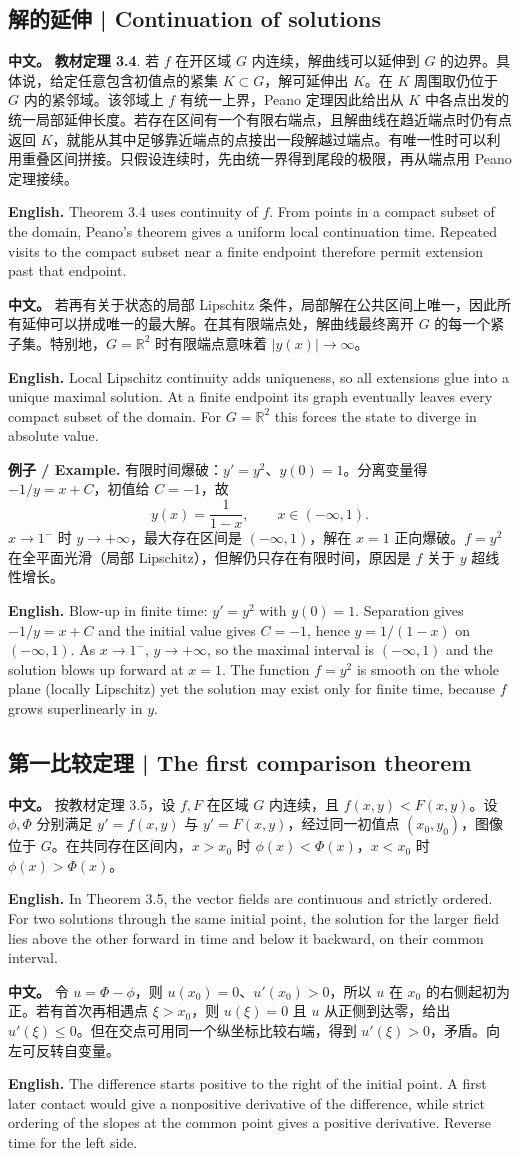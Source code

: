 \documentclass[UTF8,11pt,a4paper]{ctexart}
\newcommand{\APS}[2]{\par\noindent\textbf{中文。} #1\par\noindent\textbf{English.} #2\par}
\newcommand{\EN}[1]{\par\noindent \textbf{English.} #1\par}
\newcommand{\EX}[2]{\par\noindent \textbf{例子 / Example.} #1\par\EN{#2}}
\begin{document}
\subsection{解的延伸 | Continuation of solutions}
\APS{\textbf{教材定理 3.4}. 若 $f$ 在开区域 $G$ 内连续，解曲线可以延伸到 $G$ 的边界。具体说，给定任意包含初值点的紧集 $K\subset G$，解可延伸出 $K$。在 $K$ 周围取仍位于 $G$ 内的紧邻域。该邻域上 $f$ 有统一上界，Peano 定理因此给出从 $K$ 中各点出发的统一局部延伸长度。若存在区间有一个有限右端点，且解曲线在趋近端点时仍有点返回 $K$，就能从其中足够靠近端点的点接出一段解越过端点。有唯一性时可以利用重叠区间拼接。只假设连续时，先由统一界得到尾段的极限，再从端点用 Peano 定理接续。}{Theorem 3.4 uses continuity of $f$. From points in a compact subset of the domain, Peano's theorem gives a uniform local continuation time. Repeated visits to the compact subset near a finite endpoint therefore permit extension past that endpoint.}
\APS{若再有关于状态的局部 Lipschitz 条件，局部解在公共区间上唯一，因此所有延伸可以拼成唯一的最大解。在其有限端点处，解曲线最终离开 $G$ 的每一个紧子集。特别地，$G=\mathbb R^2$ 时有限端点意味着 $|y(x)|\to\infty$。}{Local Lipschitz continuity adds uniqueness, so all extensions glue into a unique maximal solution. At a finite endpoint its graph eventually leaves every compact subset of the domain. For $G=\mathbb R^2$ this forces the state to diverge in absolute value.}
\EX{有限时间爆破：$y'=y^2$、$y(0)=1$。分离变量得 $-1/y=x+C$，初值给 $C=-1$，故
\[
y(x)=\frac{1}{1-x},\qquad x\in(-\infty,1).
\]
$x\to1^-$ 时 $y\to+\infty$，最大存在区间是 $(-\infty,1)$，解在 $x=1$ 正向爆破。$f=y^2$ 在全平面光滑（局部 Lipschitz），但解仍只存在有限时间，原因是 $f$ 关于 $y$ 超线性增长。}{Blow-up in finite time: $y'=y^2$ with $y(0)=1$. Separation gives $-1/y=x+C$ and the initial value gives $C=-1$, hence $y=1/(1-x)$ on $(-\infty,1)$. As $x\to1^-$, $y\to+\infty$, so the maximal interval is $(-\infty,1)$ and the solution blows up forward at $x=1$. The function $f=y^2$ is smooth on the whole plane (locally Lipschitz) yet the solution may exist only for finite time, because $f$ grows superlinearly in $y$.}
\subsection{第一比较定理 | The first comparison theorem}
\APS{按教材定理 3.5，设 $f,F$ 在区域 $G$ 内连续，且 $f(x,y)<F(x,y)$。设 $\phi,\Phi$ 分别满足 $y'=f(x,y)$ 与 $y'=F(x,y)$，经过同一初值点 $(x_0,y_0)$，图像位于 $G$。在共同存在区间内，$x>x_0$ 时 $\phi(x)<\Phi(x)$，$x<x_0$ 时 $\phi(x)>\Phi(x)$。}{In Theorem 3.5, the vector fields are continuous and strictly ordered. For two solutions through the same initial point, the solution for the larger field lies above the other forward in time and below it backward, on their common interval.}
\APS{令 $u=\Phi-\phi$，则 $u(x_0)=0$、$u'(x_0)>0$，所以 $u$ 在 $x_0$ 的右侧起初为正。若有首次再相遇点 $\xi>x_0$，则 $u(\xi)=0$ 且 $u$ 从正侧到达零，给出 $u'(\xi)\le0$。但在交点可用同一个纵坐标比较右端，得到 $u'(\xi)>0$，矛盾。向左可反转自变量。}{The difference starts positive to the right of the initial point. A first later contact would give a nonpositive derivative of the difference, while strict ordering of the slopes at the common point gives a positive derivative. Reverse time for the left side.}
\end{document}
